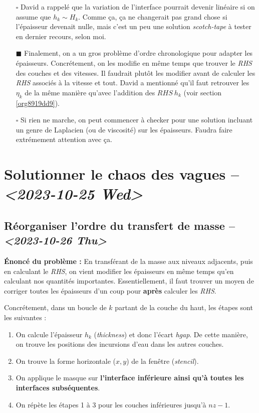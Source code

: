 \documentclass[10pt]{report}
\numberwithin{equation}{section}
\renewcommand{\boxtimes}{\blacksquare}
\begin{document}
\begin{itemize}
\item[{$\square$}] David a rappelé que la variation de l'interface pourrait devenir linéaire si on assume que \(h_k \sim H_k\).
Comme ça, ça ne changerait pas grand chose si l'épaisseur devenait nulle, mais c'est un peu une solution \emph{scotch-tape} à tester en dernier recours, selon moi.\bigskip

\item[{$\boxtimes$}] Finalement, on a un gros problème d'ordre chronologique pour adapter les épaisseurs.
Concrétement, on les modifie en même temps que trouver le \emph{RHS} des couches et des vitesses.
Il faudrait plutôt les modifier avant de calculer les \emph{RHS} associés à la vitesse et tout.
David a mentionné qu'il faut retrouver les \(\eta_k\) de la même manière qu'avec l'addition des \(RHS\ h_k\) (voir section \ref{org8919dd9}). \bigskip

\item[{$\square$}] Si rien ne marche, on peut commencer à checker pour une solution incluant un genre de Laplacien (ou de viscosité) sur les épaisseurs.
Faudra faire extrémement attention avec ça.
\end{itemize}

\section{Solutionner le chaos des vagues -- \textit{<2023-10-25 Wed>}}
\label{sec:orga6f52b7}

\subsection{Réorganiser l'ordre du transfert de masse -- \textit{<2023-10-26 Thu>}}
\label{sec:orgea28481}
\label{org8919dd9}
\textbf{Énoncé du problème :} En transférant de la masse aux niveaux adjacents, puis en calculant le \emph{RHS}, on vient modifier les épaisseurs en même temps qu'en calculant nos quantités importantes.
Essentiellement, il faut trouver un moyen de corriger toutes les épaisseurs d'un coup pour \textbf{après} calculer les \emph{RHS}. \bigskip

Concrétement, dans un boucle de \(k\) partant de la couche du haut, les étapes sont les suivantes :
\begin{enumerate}
\item On calcule l'épaisseur \(h_k\) (\emph{thickness}) et donc l'écart \emph{hgap}.
De cette manière, on trouve les positions des incursions d'eau dans les autres couches.
\item On trouve la forme horizontale (\(x,y\)) de la fenêtre (\emph{stencil}).
\item On applique le masque sur \textbf{l'interface inférieure ainsi qu'à toutes les interfaces subséquentes}.
\item On répète les étapes 1 à 3 pour les couches inférieures jusqu'à \(nz-1\).\bigskip
\end{enumerate}
\end{document}
